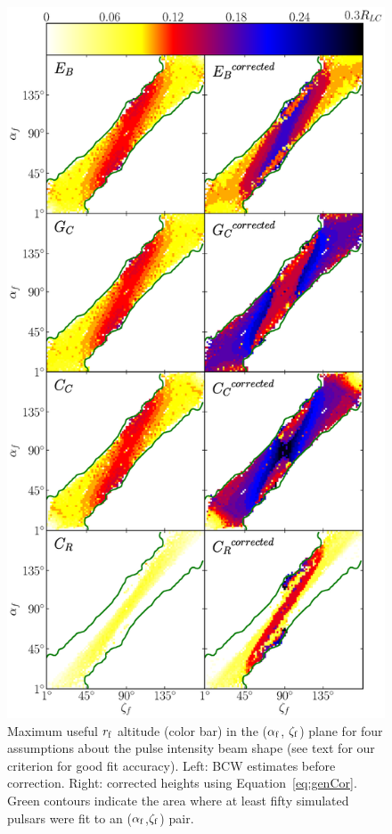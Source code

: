 \begin{figure}[htbp]
\begin{center}
\includegraphics[width=.65\textwidth]{chapters/BCWlimitations/figures/SmapGenCorrected8V2.eps}
\caption[Maximum useful $r_{\rm{f}}$ altitude (color bar) in the ($\alpha_{\rm{f}}$, $\zeta_{\rm{f}}$) plane for four
assumptions about the pulse intensity beam shape.]{
Maximum useful $r_{\rm{f}}$ altitude (color bar) in the ($\alpha_{\rm{f}}$, $\zeta_{\rm{f}}$) plane for four
assumptions about the pulse intensity beam shape (see text for our criterion
for good fit accuracy).  Left: BCW estimates before
correction. Right: corrected heights using Equation~\ref{eq:genCor}.
Green contours indicate the area where at least fifty simulated pulsars
were fit to an ($\alpha_{\rm{f}}$,$\zeta_{\rm{f}}$) pair.
}
\label{fig:SmapCorrected8}
\end{center}
\end{figure}

